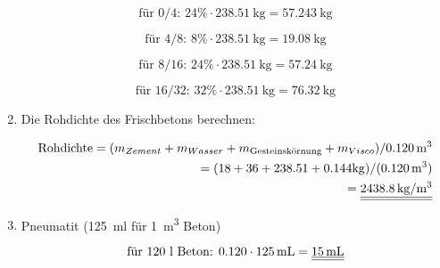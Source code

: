 \begin{solution}
\begin{enumerate}
    \begin{equation*}
        \text{für 0/4: }   24\% \cdot \SI{238.51}{\kg}  = \SI{57.243}{\kg}
    \end{equation*}
    
    \begin{equation*}
        \text{für 4/8: }   8\% \cdot \SI{238.51}{\kg}  = \SI{19.08}{\kg}
    \end{equation*}
    
    \begin{equation*}
        \text{für 8/16: }   24\% \cdot \SI{238.51}{\kg}  = \SI{57.24}{\kg}
    \end{equation*}

    \begin{equation*}
        \text{für 16/32: }   32\% \cdot \SI{238.51}{\kg}  = \SI{76.32}{\kg}
    \end{equation*}
    

    
    \item Die Rohdichte des Frischbetons berechnen: 
    
    \begin{eqnarray*}
        \text{Rohdichte}=(m_{Zement} + m_{Wasser} + m_{\text{Gesteinskörnung}} + m_{Visco})/ \SI{0.120}{\m^3} \\
        = (18+36+238.51 +0.144 \si{\kg})/( \SI{0.120}{\m^3})  \\
        = \FinRes{\SI{2438.8}{\kg\per\m^3}}
    \end{eqnarray*}
    
    \item Pneumatit (\SI{125}{\ml} für \SI{1}{m^3} Beton)
    
    \begin{equation*}
        \text{für 120 l Beton:  } 0.120 \cdot \SI{125}{\ml} = \FinRes{\SI{15}{\ml}}
    \end{equation*}
    
    
    
\end{enumerate}
\end{solution}



